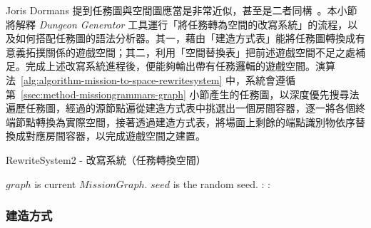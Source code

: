 Joris Dormans 提到任務圖與空間圖應當是非常近似，甚至是二者同構~\cite{dormans2010adventures}。本小節將解釋 \textit{Dungeon Generator} 工具運行「將任務轉為空間的改寫系統」的流程，以及如何搭配任務圖的語法分析器。其一，藉由「建造方式表」能將任務圖轉換成有意義拓撲關係的遊戲空間；其二，利用「空間替換表」把前述遊戲空間不足之處補足。完成上述改寫系統進程後，便能夠輸出帶有任務邏輯的遊戲空間。演算法~\ref{alg:algorithm-mission-to-space-rewritesystem} 中，系統會遵循第~\ref{ssec:method-missiongrammars-graph} 小節產生的任務圖，以深度優先搜尋法遍歷任務圖，經過的源節點遍從建造方式表中挑選出一個房間容器，逐一將各個終端節點轉換為實際空間，接著透過建造方式表，將場面上剩餘的端點識別物依序替換成對應房間容器，以完成遊戲空間之建置。

\begin{algorithm}[ht]
    \caption{RewriteSystem2 - 改寫系統（任務轉換空間）}
    \label{alg:algorithm-mission-to-space-rewritesystem}
    \begin{algorithmic}[1]
        \Require
            \Statex $graph$ is current $MissionGraph$.
            \Statex $seed$ is the random seed.
        \Ensure
            :                             
                           
                \EndIf
            \EndFor
            :            
                           
                \EndIf
            \EndFor \\
                                                                    
        \Statex
    \end{algorithmic}
\end{algorithm}

\subsubsection{建造方式}
\label{sssec:method-spacepieces-frommissiontospace-instruction}

